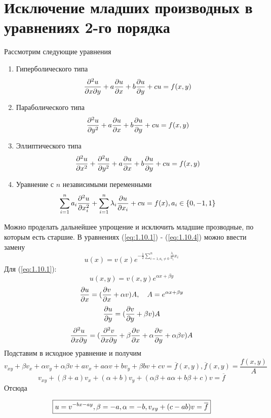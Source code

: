 \documentclass[../main.tex]{subfiles}
\begin{document}
\section{Исключение младших производных в уравнениях 2-го порядка}
Рассмотрим следующие уравнения
{\bf
\begin{enumerate}
	\item Гиперболического типа
	      \begin{equation} \label{eq:1.10.1}
			\frac{\partial ^2 u}{\partial x \partial y} + a \frac{\partial u}{\partial x} + b \frac{\partial u}{\partial y} + cu = f(x, y)
	      \end{equation}
	\item Параболического типа
	      \begin{equation} \label{eq:1.10.2}
			\frac{\partial ^2 u}{\partial y^2} + a \frac{\partial u}{\partial x} + b \frac{\partial u}{\partial y} + cu = f(x, y)
	      \end{equation}
	\item Эллиптического типа
	      \begin{equation} \label{eq:1.10.3}
		      \frac{\partial ^2 u}{\partial x^2} + \frac{\partial^2 u}{\partial y^2} + a \frac{\partial u}{\partial x} + b \frac{\partial u}{\partial y} + cu = f(x, y)
	      \end{equation}
	\item Уравнение с $n$ независимыми переменными
	      \begin{equation} \label{eq:1.10.4}
		      \sum_{i=1}^n a_i \frac{\partial^2 u }{\partial x_i^2} + \sum_{i=1}^n \lambda_i \frac{\partial u}{\partial x_i} + cu = f(x), a_i \in \{0, -1, 1\}
	      \end{equation}
\end{enumerate}}
Можно проделать дальнейшее упрощение и исключить младшие прозводные, по которым есть старшие.
В уравнениях (\ref{eq:1.10.1}) - (\ref{eq:1.10.4}) можно ввести замену
$$u(x) = v(x)e^{-\frac{1}{2} \sum \limits_{i=1, a_i \neq 0}^n \frac{\lambda_i}{a_i} x_i}$$
Для (\ref{eq:1.10.1}):
$$u(x,y) = v(x,y) e ^ {\alpha x + \beta y}$$
$$\frac{\partial u}{\partial x} = (\frac{\partial v}{\partial x}+\alpha v)A, \quad A=e ^ {\alpha x + \beta y}$$
$$\frac{\partial u}{\partial y} = (\frac{\partial v}{\partial y}+\beta v)A$$
$$\frac{\partial^2 u}{\partial x \partial y} = (\frac{\partial^2 v}{\partial x \partial y} + \beta \frac{\partial v}{\partial x} + \alpha \frac{\partial v}{\partial y} + \alpha \beta v)A$$
Подставим в исходное уравнение и получим
$$v_{xy} + \beta v_x + \alpha v_y + \alpha \beta v + a v_x + a \alpha v + b v_y + \beta b v + cv = \overline{f}(x,y), \overline{f}(x,y) = \frac{f(x,y)}{A}$$
$$v_{xy} + (\beta + a)v_x + (\alpha + b)v_y + (\alpha \beta + a \alpha + b \beta + c)v = \overline{f}$$
Отсюда

\begin{equation*}
	\boxed{
		u = v^{-bx - ay}, \\
		\beta = -a, \alpha = -b,\\
		v_{xy} + (c-ab)v = \overline{f}
	}
\end{equation*}
\end{document}
